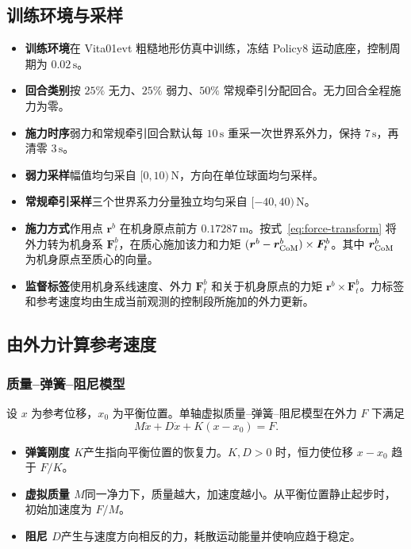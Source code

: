 \subsection{训练环境与采样}
\begin{itemize}
  \item \textbf{训练环境}\enspace 在 Vita01evt 粗糙地形仿真中训练，冻结 Policy8 运动底座，控制周期为 $0.02\,\mathrm{s}$。
  \item \textbf{回合类别}\enspace 按 $25\%$ 无力、$25\%$ 弱力、$50\%$ 常规牵引分配回合。无力回合全程施力为零。
  \item \textbf{施力时序}\enspace 弱力和常规牵引回合默认每 $10\,\mathrm{s}$ 重采一次世界系外力，保持 $7\,\mathrm{s}$，再清零 $3\,\mathrm{s}$。
  \item \textbf{弱力采样}\enspace 幅值均匀采自 $[0,10)\,\mathrm N$，方向在单位球面均匀采样。
  \item \textbf{常规牵引采样}\enspace 三个世界系力分量独立均匀采自 $[-40,40)\,\mathrm N$。
  \item \textbf{施力方式}\enspace 作用点 $\bm r^b$ 在机身原点前方 $0.17287\,\mathrm m$。按式~\eqref{eq:force-transform} 将外力转为机身系 $\bm F_t^b$，在质心施加该力和力矩 $(\bm r^b-\bm r_{\rm CoM}^b)\times\bm F_t^b$。其中 $\bm r_{\rm CoM}^b$ 为机身原点至质心的向量。
  \item \textbf{监督标签}\enspace 使用机身系线速度、外力 $\bm F_t^b$ 和关于机身原点的力矩 $\bm r^b\times\bm F_t^b$。力标签和参考速度均由生成当前观测的控制段所施加的外力更新。
\end{itemize}

\subsection{由外力计算参考速度}

\subsubsection{质量--弹簧--阻尼模型}
设 $x$ 为参考位移，$x_0$ 为平衡位置。单轴虚拟质量--弹簧--阻尼模型在外力 $F$ 下满足
\begin{equation}
 M\ddot x+D\dot x+K(x-x_0)=F.
\end{equation}
\begin{itemize}
  \item \textbf{弹簧刚度 $K$}\enspace 产生指向平衡位置的恢复力。$K,D>0$ 时，恒力使位移 $x-x_0$ 趋于 $F/K$。
  \item \textbf{虚拟质量 $M$}\enspace 同一净力下，质量越大，加速度越小。从平衡位置静止起步时，初始加速度为 $F/M$。
  \item \textbf{阻尼 $D$}\enspace 产生与速度方向相反的力，耗散运动能量并使响应趋于稳定。
\end{itemize}

